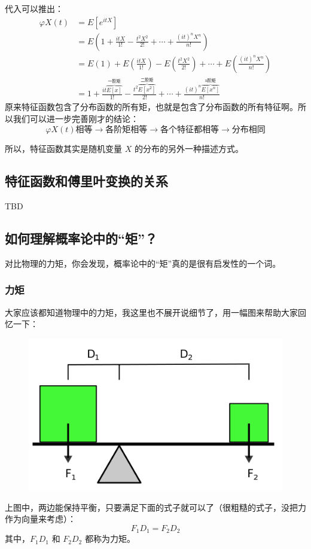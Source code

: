 \documentclass[12pt]{article}
\begin{document}
代入可以推出：
\begin{align}
\varphi X(t) &= E[e^{itX}] \\
&= E(1 + \frac{itX}{1!} - \frac{t^2X^2}{2!} + \cdots + \frac{(it)^nX^n}{n!}) \\
&= E(1) + E(\frac{itX}{1!}) - E(\frac{t^2X^2}{2!}) + \cdots + E(\frac{(it)^nX^n}{n!}) \\
&= 1 + \frac{it\overbrace{E[x]}^{\text{一阶矩}}}{1!} - \frac{t^2\overbrace{E[x^2]}^{\text{二阶矩}}}{2!} + \cdots +  \frac{(it)^n\overbrace{E[x^n]}^{\text{n阶矩}}}{n!} 
\end{align}
原来特征函数包含了分布函数的所有矩，也就是包含了分布函数的所有特征啊。所以我们可以进一步完善刚才的结论：
$$
\varphi X(t) \textbf{相等} \rightarrow \textbf{各阶矩相等} \rightarrow \textbf{各个特征都相等} \rightarrow \textbf{分布相同} 
$$

所以，特征函数其实是随机变量 $X$ 的分布的另外一种描述方式。

\subsection{特征函数和傅里叶变换的关系\cite{Understand_Feature_Function}}
TBD

\subsection{如何理解概率论中的“矩”？\cite{Understand_Moment_In_Prob}}
对比物理的力矩，你会发现，概率论中的“矩”真的是很有启发性的一个词。

\subsubsection{力矩}
大家应该都知道物理中的力矩，我这里也不展开说细节了，用一幅图来帮助大家回忆一下：
\begin{figure}[H]
  \centering
  \includegraphics[width=.5\textwidth]{fig/MomentInForce.png} 
\end{figure}
上图中，两边能保持平衡，只要满足下面的式子就可以了（很粗糙的式子，没把力作为向量来考虑）：
$$
F_1D_1 = F_2D_2
$$
其中，$F_1D_1$ 和 $F_2D_2$ 都称为力矩。
\end{document}
